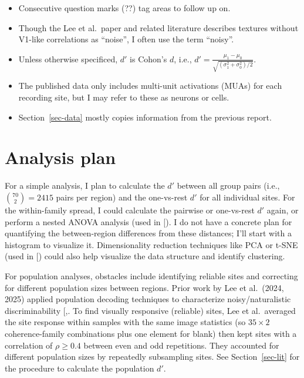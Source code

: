\documentclass[
  11pt,
  letterpaper,
  DIV=11,
  numbers=noendperiod]{scrartcl}
\providecommand{\tightlist}{%
  \setlength{\itemsep}{0pt}\setlength{\parskip}{0pt}}
\begin{document}
\begin{itemize}
\tightlist
\item
  Consecutive question marks (??) tag areas to follow up on.
\item
  Though the Lee et al.~paper and related literature describes textures
  without V1-like correlations as ``noise'', I often use the term
  ``noisy''.
\item
  Unless otherwise specificed, \(d'\) is Cohon's \(d\), i.e.,
  \(d' = \frac{\mu_1 - \mu_0}{\sqrt{(\sigma^2_1 + \sigma^2_0)/2}}\).
\item
  The published data only includes multi-unit activations (MUAs) for
  each recording site, but I may refer to these as neurons or cells.
\item
  Section~\ref{sec-data} mostly copies information from the previous
  report.
\end{itemize}

\section{Analysis plan}\label{analysis-plan}

For a simple analysis, I plan to calculate the \(d'\) between all group
pairs (i.e., \(\binom{70}{2} = 2415\) pairs per region) and the
one-vs-rest \(d'\) for all individual sites. For the within-family
spread, I could calculate the pairwise or one-vs-rest \(d'\) again, or
perform a nested ANOVA analysis (used in
{[}\citeproc{ref-ziemba_selectivity_2016}{2}{]}). I do not have a
concrete plan for quantifying the between-region differences from these
distances; I'll start with a histogram to visualize it. Dimensionality
reduction techniques like PCA or t-SNE (used in
{[}\citeproc{ref-ziemba_selectivity_2016}{2}{]}) could also help
visualize the data structure and identify clustering.

For population analyses, obstacles include identifying reliable sites
and correcting for different population sizes between regions. Prior
work by Lee et al.~(2024, 2025) applied population decoding techniques
to characterize noisy/naturalistic discriminability
{[},\citeproc{ref-lee_emergence_2025}{6}{]}.
To find visually responsive (reliable) sites, Lee et al.~averaged the
site response within samples with the same image statistics (so
\(35 \times 2\) coherence-family combinations plus one element for
blank) then kept sites with a correlation of \(\rho \geq 0.4\) between
even and odd repetitions. They accounted for different population sizes
by repeatedly subsampling sites. See Section~\ref{sec-lit} for the
procedure to calculate the population \(d'\).
\end{document}
